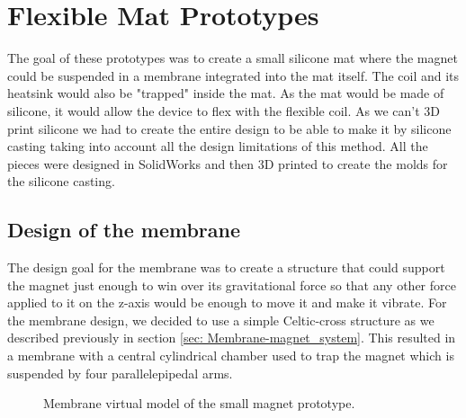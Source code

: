 \section{Flexible Mat Prototypes}
\label{sec: Flexible_Mat_Prototypes}
The goal of these prototypes was to create a small silicone mat where the magnet could be suspended in a membrane integrated into the mat itself.
The coil and its heatsink would also be "trapped" inside the mat.
As the mat would be made of silicone, it would allow the device to flex with the flexible coil.
As we can't 3D print silicone we had to create the entire design to be able to make it by silicone casting taking into account all the design limitations of this method.
All the pieces were designed in SolidWorks and then 3D printed to create the molds for the silicone casting. 

\subsection{Design of the membrane}
The design goal for the membrane was to create a structure that could support the magnet just enough to win over its gravitational force so that any other force applied to it on the z-axis would be enough to move it and make it vibrate.
For the membrane design, we decided to use a simple Celtic-cross structure as we described previously in section \ref{sec: Membrane-magnet_system}.
This resulted in a membrane with a central cylindrical chamber used to trap the magnet which is suspended by four parallelepipedal arms.
\begin{figure}
    \centering
    \caption{Membrane virtual model of the small magnet prototype.}
    \label{fig: Membrane_v1_model}
\end{figure}

